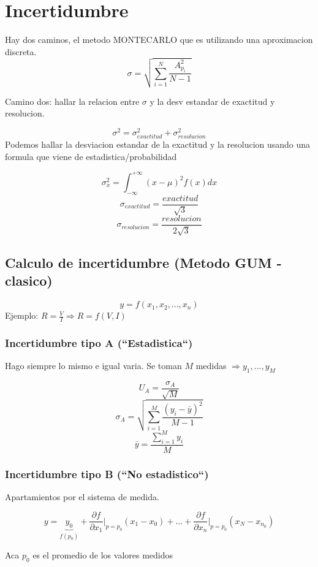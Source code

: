 \documentclass{report}
\begin{document}
\tableofcontents

\chapter{Incertidumbre}

Hay dos caminos, el metodo MONTECARLO que es utilizando una aproximacion discreta.
$$\sigma = \sqrt{\sum_{i=1}^{N} \frac{A_{p_i}^2}{N-1} }$$


Camino dos: hallar la relacion entre $\sigma$ y la desv estandar de exactitud y resolucion.

$$\sigma^2 = \sigma_{exactitud}^2 + \sigma_{resolucion}^2 $$
Podemos hallar la desviacion estandar de la exactitud y la resolucion usando una formula que viene de estadistica/probabilidad

$$\sigma_x^2 = \int_{-\infty}^{+\infty}{(x-\mu)^2f(x)dx}$$
$$\sigma_{exactitud} = \frac{exactitud}{\sqrt{3}}$$
$$\sigma_{resolucion} = \frac{resolucion}{2\sqrt{3}}$$


\section{Calculo de incertidumbre (Metodo GUM - clasico)}


$$y = f(x_1,x_2,...,x_n)$$
Ejemplo: $R = \frac{V}{I} \Rightarrow R = f(V,I)$

\subsection{Incertidumbre tipo A (``Estadistica``)}

Hago siempre lo mismo e igual varia.
Se toman $M$ medidas $\Rightarrow y_1,...,y_M$

$$U_A = \frac{\sigma_A}{\sqrt{M}}$$
$$\sigma_A = \sqrt{\sum_{i=1}^M{\frac{(y_i - \bar{y})^2}{M-1}}}$$
$$\bar{y} = \frac{\sum_{i=1}^M{y_i}}{M}$$


\subsection{Incertidumbre tipo B (``No estadistico``)}

Apartamientos por el sistema de medida.

$$y = \underbrace{y_0}_{f(p_0)} + \frac{\partial{f}}{\partial x_1}
	\rvert_{p=p_0} (x_1 - x_0) + ... + \frac{\partial{f}}{\partial x_n}
	\rvert_{p=p_0} (x_N - x_{n_0})$$

Aca $p_0$ es el promedio de los valores medidos
\end{document}
